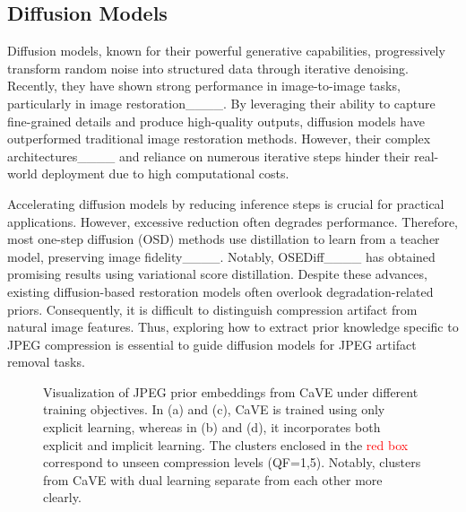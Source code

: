 \subsection{Diffusion Models}
\vspace{-2mm}
Diffusion models, known for their powerful generative capabilities, progressively transform random noise into structured data through iterative denoising. Recently, they have shown strong performance in image-to-image tasks, particularly in image restoration____. By leveraging their ability to capture fine-grained details and produce high-quality outputs, diffusion models have outperformed traditional image restoration methods. However, their complex architectures____ and reliance on numerous iterative steps hinder their real-world deployment due to high computational costs.

Accelerating diffusion models by reducing inference steps is crucial for practical applications. However, excessive reduction often degrades performance. Therefore, most one-step diffusion (OSD) methods use distillation to learn from a teacher model, preserving image fidelity____. Notably, OSEDiff____ has obtained promising results using variational score distillation. Despite these advances, existing diffusion-based restoration models often overlook degradation-related priors. Consequently, it is difficult to distinguish compression artifact from natural image features. Thus, exploring how to extract prior knowledge specific to JPEG compression is essential to guide diffusion models for JPEG artifact removal tasks.

\begin{figure*}[t]
    \begin{center}
    \end{center}
    \vspace{-6.5mm}
    \caption{Visualization of JPEG prior embeddings from CaVE under different training objectives. In (a) and (c), CaVE is trained using only explicit learning, whereas in (b) and (d), it incorporates both explicit and implicit learning. The clusters enclosed in the \textcolor{red}{red box} correspond to unseen compression levels (QF=1,5). Notably, clusters from CaVE with dual learning separate from each other more clearly.}
    \vspace{-6mm}
    \label{fig:clusters}
\end{figure*}


